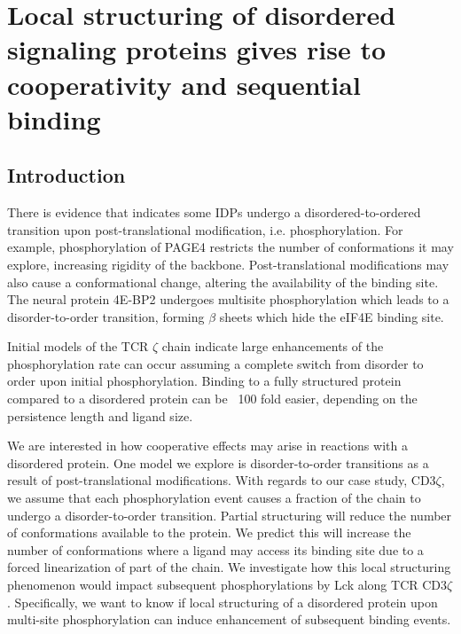 \documentclass[../../AdvancementSummary.tex]{subfiles}
\begin{document}
\section{Local structuring of disordered signaling proteins gives rise to cooperativity and sequential binding}
\label{sec:LocalStruct}


\subsection{Introduction}


There is evidence that indicates some IDPs undergo a disordered-to-ordered transition upon post-translational modification, i.e. phosphorylation. For example, phosphorylation of PAGE4 restricts the number of conformations it may explore, increasing rigidity of the backbone.\cite{He2015} Post-translational modifications may also cause a conformational change, altering the availability of the binding site.  The neural protein 4E-BP2 undergoes multisite phosphorylation which leads to a disorder-to-order transition, forming $\beta$ sheets which hide the eIF4E binding site. \cite{Bah2015} 

Initial models of the TCR $\zeta$ chain indicate large enhancements of the phosphorylation rate can occur assuming a complete switch from disorder to order upon initial phosphorylation. Binding to a fully structured protein compared to a disordered protein can be ~100 fold easier, depending on the persistence length and ligand size. \cite{Mukhopadhyay2016}


We are interested in how cooperative effects may arise in reactions with a disordered protein. One model we explore is disorder-to-order transitions as a result of post-translational modifications. With regards to our case study, CD3$\zeta$, we assume that each phosphorylation event causes a fraction of the chain to undergo a disorder-to-order transition. Partial structuring will reduce the number of conformations available to the protein. We predict this will increase the number of conformations where a ligand may access its binding site due to a forced linearization of part of the chain. We investigate how this local structuring phenomenon would impact subsequent phosphorylations by Lck along TCR CD3$\zeta$. Specifically, we want to know if local structuring of a disordered protein upon multi-site phosphorylation can induce enhancement of subsequent binding events.
\end{document}
